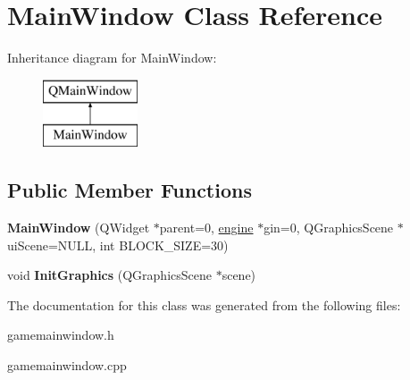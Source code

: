 \hypertarget{class_main_window}{\section{Main\-Window Class Reference}
\label{class_main_window}
}
Inheritance diagram for Main\-Window\-:\begin{figure}[H]
\begin{center}
\leavevmode
\includegraphics[height=2.000000cm]{class_main_window}
\end{center}
\end{figure}
\subsection*{Public Member Functions}
\begin{DoxyCompactItemize}
\item 
\hypertarget{class_main_window_a100ead45842e8680c9cbfa334a0e30b4}{{\bfseries Main\-Window} (Q\-Widget $\ast$parent=0, \hyperlink{classengine}{engine} $\ast$gin=0, Q\-Graphics\-Scene $\ast$ui\-Scene=N\-U\-L\-L, int B\-L\-O\-C\-K\-\_\-\-S\-I\-Z\-E=30)}\label{class_main_window_a100ead45842e8680c9cbfa334a0e30b4}

\item 
\hypertarget{class_main_window_abbbcd7e315b91ac8ead9d87fa61c9f3c}{void {\bfseries Init\-Graphics} (Q\-Graphics\-Scene $\ast$scene)}\label{class_main_window_abbbcd7e315b91ac8ead9d87fa61c9f3c}

\end{DoxyCompactItemize}


The documentation for this class was generated from the following files\-:\begin{DoxyCompactItemize}
\item 
gamemainwindow.\-h\item 
gamemainwindow.\-cpp\end{DoxyCompactItemize}
